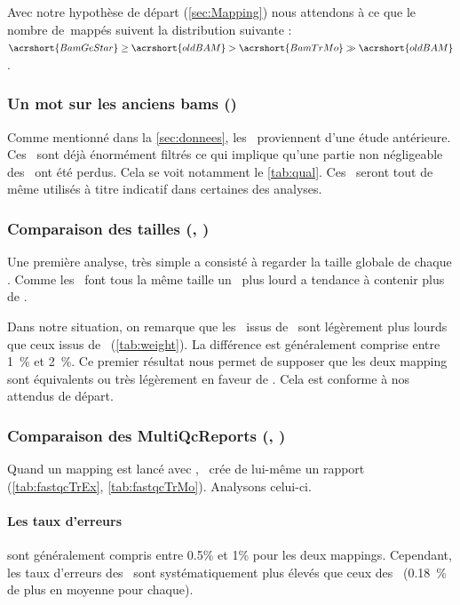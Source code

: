 \documentclass[../main]{subfiles} %
\begin{document}
Avec notre hypothèse de départ (\cref{sec:Mapping}) nous attendons à ce que le nombre de \reads\,mappés suivent la distribution suivante : $\acrshort{BamGeStar} \geq \acrshort{oldBAM} > \acrshort{BamTrMo} \gg \acrshort{oldBAM}$.

\subsubsection{Un mot sur les anciens bams (\OldBam)}
\label{sec:oldBam}
Comme mentionné dans la \cref{sec:donnees}, les \OldBam proviennent d'une étude antérieure. Ces \bam sont déjà énormément filtrés ce qui implique qu'une partie non négligeable des \reads ont été perdus. Cela se voit notamment le \cref{tab:qual}. Ces \bam seront tout de même utilisés à titre indicatif dans certaines des analyses.


\subsubsection{Comparaison des tailles (\BamTrEx, \BamTrMo)}
Une première analyse, très simple a consisté à regarder la taille globale de chaque \bam. Comme les \reads font tous la même taille un \bam plus lourd a tendance à contenir plus de \reads.






Dans notre situation, on remarque que les \bam issus de \TrMo sont légèrement plus lourds que ceux issus de \TrEx (\cref{tab:weight}). La différence est généralement comprise entre 1 \% et 2 \%. Ce premier résultat nous permet de supposer que les deux \gls{mapping} sont équivalents ou très légèrement en faveur de \TrEx. Cela est conforme à nos attendus de départ.


\subsubsection{Comparaison des MultiQcReports (\BamTrEx, \BamTrMo)}
\label{sec:fastqc}
Quand un \gls{mapping} est lancé avec \GeCKO, \GeCKO crée de lui-même un rapport \fastqc (\cref{tab:fastqcTrEx}, \cref{tab:fastqcTrMo}). Analysons celui-ci.







\paragraph{Les taux d'erreurs} sont généralement compris entre 0.5\% et 1\% pour les deux \glspl{mapping}. Cependant, les taux d'erreurs des \BamTrMo sont systématiquement plus élevés que ceux des \BamTrEx (0.18 \% de plus en moyenne pour chaque). 
\end{document}
